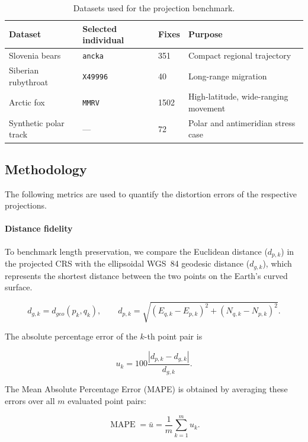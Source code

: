 \begin{table}[htbp]
    \centering
    \caption{Datasets used for the projection benchmark.}
    \label{tab:projection-benchmark-datasets}
    \begin{tabular}{llll}
        \toprule
        Dataset & Selected individual & Fixes & Purpose \\
        \midrule
        Slovenia bears
            & \texttt{ancka}
            & 351
            & Compact regional trajectory \\
        Siberian rubythroat
            & \texttt{X49996}
            & 40
            & Long-range migration \\
        Arctic fox
            & \texttt{MMRV}
            & 1502
            & High-latitude, wide-ranging movement \\
        Synthetic polar track
            & ---
            & 72
            & Polar and antimeridian stress case \\
        \bottomrule
    \end{tabular}
\end{table}

\subsection{Methodology}
\label{subsec:projection-benchmark-methodology}
The following metrics are used to quantify the distortion errors of the respective projections.

\paragraph{Distance fidelity}
\label{par:Dist-fid}
To benchmark length preservation, we compare the Euclidean distance ($d_{p,k}$) in the projected CRS with the ellipsoidal WGS~84
geodesic distance ($d_{g,k}$), which represents the shortest distance between the
two points on the Earth's curved surface.

\[
d_{g,k}=d_{geo}(p_k,q_k),
\qquad
d_{p,k}
=
\sqrt{
    (E_{q,k}-E_{p,k})^2
    +
    (N_{q,k}-N_{p,k})^2
}.
\]

The absolute percentage error of the \(k\)-th point pair is

\[
u_k
=
100
\frac{|d_{p,k}-d_{g,k}|}{d_{g,k}}.
\]

The Mean Absolute Percentage Error (MAPE) is obtained by averaging these
errors over all \(m\) evaluated point pairs:

\[
\operatorname{MAPE}
=
\bar{u}
=
\frac{1}{m}
\sum_{k=1}^{m} u_k.
\]

